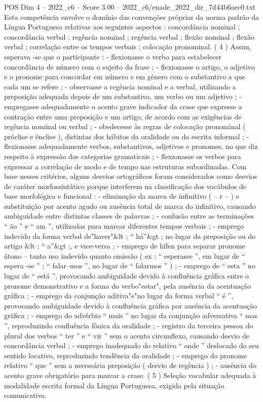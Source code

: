 \begin{textsample}{POS Dim 4 – 2022\_c6 – Score 3.00 – 2022\_c6/enade\_2022\_dir\_7d44b6aec0.txt}
Esta competência envolve o domínio das convenções próprias da norma padrão da Língua Portuguesa relativas aos seguintes aspectos : concordância nominal ; concordância verbal ; regência nominal ; regência verbal ; flexão nominal ; flexão verbal ; correlação entre os tempos verbais ; colocação pronominal. ( 4 ) Assim, esperava -se que o participante : - flexionasse o verbo para estabelecer concordância de número com o sujeito da frase ; - flexionasse o artigo, o adjetivo e o pronome para concordar em número e em gênero com o substantivo a que cada um se refere ; - observasse a regência nominal e a verbal, utilizando a preposição adequada depois de um substantivo, um verbo ou um adjetivo ; - empregasse adequadamente o acento grave indicador da crase que expresse a contração entre uma preposição e um artigo, de acordo com as exigências de regência nominal ou verbal ; - obedecesse às regras de colocação pronominal ( próclise e ênclise ), distintas dos hábitos da oralidade ou da escrita informal ; - flexionasse adequadamente verbos, substantivos, adjetivos e pronomes, no que diz respeito à expressão das categorias gramaticais ; - flexionasse os verbos para expressar a correlação de modo e de tempo nas estruturas subordinadas.
Com base nesses critérios, alguns desvios ortográficos foram considerados como desvios de caráter morfossintático porque interferem na classificação dos vocábulos de base morfológica e funcional : - eliminação da marca de infinitivo ( – r – ) e substituição por acento agudo ou ausência total de marca do infinitivo, causando ambiguidade entre distintas classes de palavras ; - confusão entre as terminações “ ão ” e “ am ”, utilizadas para marcar diferentes tempos verbais ; - emprego indevido da forma verbal de"haver"\&lt ; “ há”\&gt ; no lugar da preposição ou do artigo \&lt ; “ a”\&gt ;, e vice-versa ; - emprego de hífen para separar pronome átono – tanto uso indevido quanto omissão ( ex : “ esperasse ”, em lugar de “ espera -se ” ; “ falar–mos ”, no lugar de “ falarmos ” ) ; - emprego de “ esta ” no lugar de “ está ”, provocando ambiguidade devido à confluência gráfica entre o pronome demonstrativo e a forma do verbo"estar", pela ausência da acentuação gráfica ; - emprego da conjunção aditiva"e"no lugar da forma verbal “ é ”, provocando ambiguidade devido à confluência gráfica por ausência da acentuação gráfica ; - emprego do advérbio “ mais ” no lugar da conjunção adversativa “ mas ”, reproduzindo confluência fônica da oralidade ; - registro da terceira pessoa do plural dos verbos “ ter ” e “ vir ” sem o acento circunflexo, causando desvio de concordância verbal ; - emprego inadequado do relativo “ onde ” deslocado do seu sentido locativo, reproduzindo tendência da oralidade ; - emprego do pronome relativo “ que ” sem a necessária preposição ( desvio de regência ) ; - ausência do acento grave obrigatório para marcar a crase. ( 5 ) Seleção vocabular adequada à modalidade escrita formal da Língua Portuguesa, exigida pela situação comunicativa.

\end{textsample}
